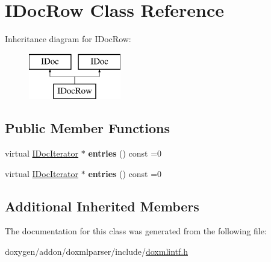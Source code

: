 \hypertarget{class_i_doc_row}{}\section{I\+Doc\+Row Class Reference}
\label{class_i_doc_row}
Inheritance diagram for I\+Doc\+Row\+:\begin{figure}[H]
\begin{center}
\leavevmode
\includegraphics[height=2.000000cm]{class_i_doc_row}
\end{center}
\end{figure}
\subsection*{Public Member Functions}
\begin{DoxyCompactItemize}
\item 
\mbox{\label{class_i_doc_row_adea1c188e574a8cce7f598e70ab8b530}} 
virtual \mbox{\hyperlink{class_i_doc_iterator}{I\+Doc\+Iterator}} $\ast$ {\bfseries entries} () const =0
\item 
\mbox{\label{class_i_doc_row_adea1c188e574a8cce7f598e70ab8b530}} 
virtual \mbox{\hyperlink{class_i_doc_iterator}{I\+Doc\+Iterator}} $\ast$ {\bfseries entries} () const =0
\end{DoxyCompactItemize}
\subsection*{Additional Inherited Members}


The documentation for this class was generated from the following file\+:\begin{DoxyCompactItemize}
\item 
doxygen/addon/doxmlparser/include/\mbox{\hyperlink{include_2doxmlintf_8h}{doxmlintf.\+h}}\end{DoxyCompactItemize}
